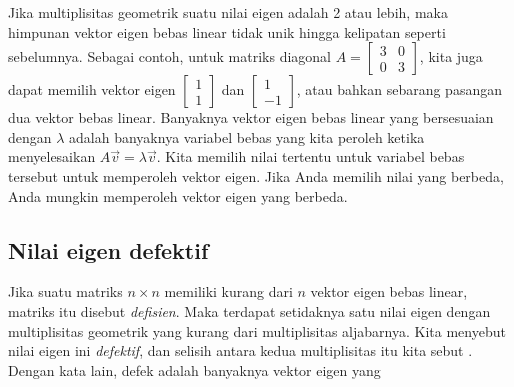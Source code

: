 Jika multiplisitas geometrik suatu nilai eigen adalah 2 atau lebih,
maka himpunan vektor eigen bebas linear tidak unik hingga
kelipatan seperti sebelumnya.  Sebagai contoh, untuk matriks diagonal $A =
\left[ \begin{smallmatrix} 3 & 0 \\ 0 & 3 \end{smallmatrix} \right]$,
kita juga dapat memilih vektor eigen
$\left[ \begin{smallmatrix} 1 \\ 1 \end{smallmatrix} \right]$
dan
$\left[ \begin{smallmatrix} 1 \\ -1 \end{smallmatrix} \right]$, atau bahkan
sebarang pasangan dua vektor bebas linear.  Banyaknya vektor eigen
bebas linear yang bersesuaian dengan $\lambda$
adalah banyaknya variabel bebas yang kita peroleh ketika menyelesaikan $A\vec{v} =
\lambda \vec{v}$.  Kita memilih nilai tertentu untuk variabel bebas tersebut untuk
memperoleh vektor eigen.  Jika Anda memilih nilai yang berbeda, Anda mungkin memperoleh vektor eigen
yang berbeda.


\subsection{Nilai eigen defektif}

Jika suatu matriks $n \times n$ memiliki kurang dari $n$ vektor eigen
bebas linear, matriks itu disebut \emph{defisien}.
Maka terdapat setidaknya
satu nilai eigen dengan multiplisitas geometrik yang kurang dari
multiplisitas
aljabarnya.  Kita menyebut nilai eigen ini \emph{defektif},
dan selisih
antara kedua multiplisitas itu kita sebut \emph{}.
Dengan kata lain, defek adalah banyaknya vektor eigen yang


